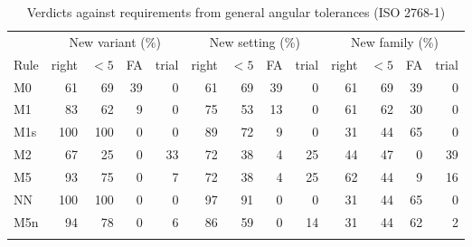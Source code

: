 \documentclass[pdflatex,sn-basic]{sn-jnl}
\newcommand{\tabsize}{\fontsize{8}{9.5}\selectfont}
\begin{document}
\begin{table}[tbp]
\tabsize
\setlength{\tabcolsep}{2.4pt}
\caption{Verdicts against requirements from general angular tolerances (ISO 2768-1)}\label{tab:scenarios}
\begin{tabular}{@{}lrrrrrrrrrrrr@{}}
\toprule
 & \multicolumn{4}{c}{New variant (\%)} & \multicolumn{4}{c}{New setting (\%)} & \multicolumn{4}{c}{New family (\%)} \\
\cmidrule(lr){2-5}\cmidrule(lr){6-9}\cmidrule(lr){10-13}
Rule & right & ${<}5$ & FA & trial & right & ${<}5$ & FA & trial & right & ${<}5$ & FA & trial \\
\midrule
M0 & 61 & 69 & 39 & 0 & 61 & 69 & 39 & 0 & 61 & 69 & 39 & 0 \\
M1 & 83 & 62 & 9 & 0 & 75 & 53 & 13 & 0 & 61 & 62 & 30 & 0 \\
M1s & 100 & 100 & 0 & 0 & 89 & 72 & 9 & 0 & 31 & 44 & 65 & 0 \\
M2 & 67 & 25 & 0 & 33 & 72 & 38 & 4 & 25 & 44 & 47 & 0 & 39 \\
M5 & 93 & 75 & 0 & 7 & 72 & 38 & 4 & 25 & 62 & 44 & 9 & 16 \\
NN & 100 & 100 & 0 & 0 & 97 & 91 & 0 & 0 & 31 & 44 & 65 & 0 \\
M5n & 94 & 78 & 0 & 6 & 86 & 59 & 0 & 14 & 31 & 44 & 62 & 2 \\
\botrule
\end{tabular}
\end{table}
\end{document}
